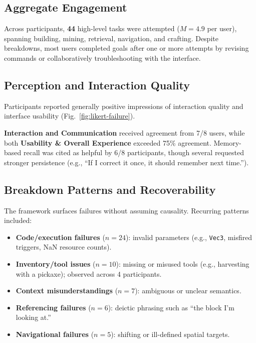 


\FloatBarrier


\subsection{Aggregate Engagement}
Across participants, \textbf{44} high-level tasks were attempted (\(M = 4.9\) per user), spanning building, mining, retrieval, navigation, and crafting. Despite breakdowns, most users completed goals after one or more attempts by revising commands or collaboratively troubleshooting with the interface.

\subsection{Perception and Interaction Quality}
Participants reported generally positive impressions of interaction quality and interface usability (Fig.~\ref{fig:likert-failure}). 

\textbf{Interaction and Communication} received agreement from 7/8 users, while both \textbf{Usability \& Overall Experience} exceeded 75\% agreement. Memory-based recall was cited as helpful by 6/8 participants, though several requested stronger persistence (e.g., “If I correct it once, it should remember next time.”).

\subsection{Breakdown Patterns and Recoverability}
The framework surfaces failures without assuming causality. Recurring patterns included:

\begin{itemize}[leftmargin=*,itemsep=2pt]
  \item \textbf{Code/execution failures} (\(n=24\)): invalid parameters (e.g., \texttt{Vec3}, misfired triggers, NaN resource counts).
  \item \textbf{Inventory/tool issues} (\(n=10\)): missing or misused tools (e.g., harvesting with a pickaxe); observed across 4 participants.
  \item \textbf{Context misunderstandings} (\(n=7\)): ambiguous or unclear semantics.
  \item \textbf{Referencing failures} (\(n=6\)): deictic phrasing such as “the block I'm looking at.”
  \item \textbf{Navigational failures} (\(n=5\)): shifting or ill-defined spatial targets.
\end{itemize}

